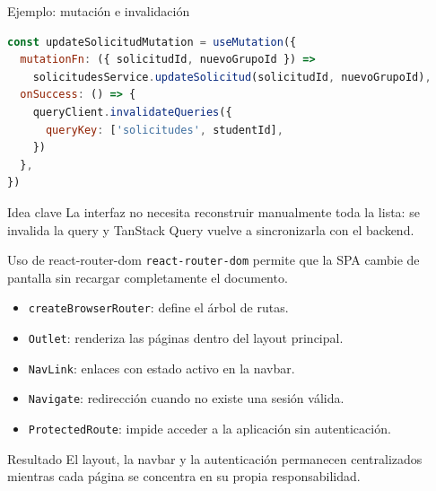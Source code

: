 \documentclass[aspectratio=169,11pt]{beamer}
\begin{document}
\begin{frame}[fragile]{Ejemplo: mutación e invalidación}
\begin{lstlisting}[language=JavaScript]
const updateSolicitudMutation = useMutation({
  mutationFn: ({ solicitudId, nuevoGrupoId }) =>
    solicitudesService.updateSolicitud(solicitudId, nuevoGrupoId),
  onSuccess: () => {
    queryClient.invalidateQueries({
      queryKey: ['solicitudes', studentId],
    })
  },
})
\end{lstlisting}
\begin{exampleblock}{Idea clave}
  La interfaz no necesita reconstruir manualmente toda la lista: se invalida la
  query y TanStack Query vuelve a sincronizarla con el backend.
\end{exampleblock}
\end{frame}

\begin{frame}{Uso de react-router-dom}
  \texttt{react-router-dom} permite que la SPA cambie de pantalla sin recargar
  completamente el documento.
  \begin{itemize}
    \item \texttt{createBrowserRouter}: define el árbol de rutas.
    \item \texttt{Outlet}: renderiza las páginas dentro del layout principal.
    \item \texttt{NavLink}: enlaces con estado activo en la navbar.
    \item \texttt{Navigate}: redirección cuando no existe una sesión válida.
    \item \texttt{ProtectedRoute}: impide acceder a la aplicación sin autenticación.
  \end{itemize}
  \vspace{0.25cm}
  \begin{block}{Resultado}
    El layout, la navbar y la autenticación permanecen centralizados mientras
    cada página se concentra en su propia responsabilidad.
  \end{block}
\end{frame}
\end{document}
